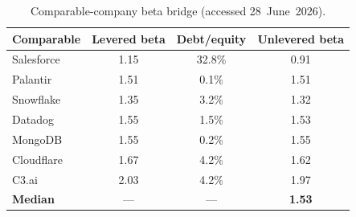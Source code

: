 \begin{table}[H]
\centering
\caption{Comparable-company beta bridge (accessed 28~June~2026).}
\label{tab:beta}
\begin{tabular}{lccc}
\toprule
Comparable & Levered beta & Debt/equity & Unlevered beta \\
\midrule
Salesforce & 1.15 & 32.8\% & 0.91 \\
Palantir & 1.51 & 0.1\% & 1.51 \\
Snowflake & 1.35 & 3.2\% & 1.32 \\
Datadog & 1.55 & 1.5\% & 1.53 \\
MongoDB & 1.55 & 0.2\% & 1.55 \\
Cloudflare & 1.67 & 4.2\% & 1.62 \\
C3.ai & 2.03 & 4.2\% & 1.97 \\
\midrule
\textbf{Median} & --- & --- & \textbf{1.53} \\
\bottomrule
\end{tabular}
\end{table}
